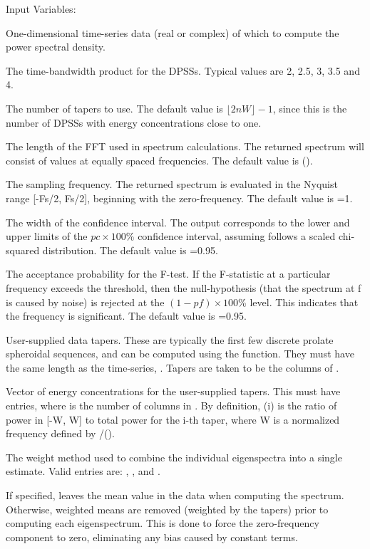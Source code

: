 \noindent Input Variables:
\begin{texitable}
\item[\var{x}] One-dimensional time-series data (real or complex) of which to compute the power spectral density.
\item[\var{nW}] The time-bandwidth product for the DPSSs.  Typical values are 2, 2.5, 3, 3.5 and 4.
\item[\var{nseq}] The number of tapers to use.  The default value is $\lfloor 2nW \rfloor - 1$, since this is the number of DPSSs with energy concentrations close to one.
\item[\var{NFFT}] The length of the FFT used in spectrum calculations.  The returned spectrum will consist of  values at equally spaced frequencies.  The default value is ().
\item[\var{Fs}] The sampling frequency.  The returned spectrum is evaluated in the Nyquist range [-Fs/2, Fs/2], beginning with the zero-frequency.  The default value is =1.
\item[\var{pc}] The width of the confidence interval.  The output  corresponds to the lower and upper limits of the $pc\times100$\% confidence interval, assuming  follows a scaled chi-squared distribution.  The default value is =0.95.
\item[\var{pf}] The acceptance probability for the F-test.  If the F-statistic at a particular frequency exceeds the threshold, then the null-hypothesis (that the spectrum at f is caused by noise) is rejected at the $(1-pf)\times100$\% level. This indicates that the frequency is significant.  The default value is =0.95.
\item [\var{h}] User-supplied data tapers.  These are typically the first few discrete prolate spheroidal sequences, and can be computed using the  function.  They must have the same length as the time-series, .  Tapers are taken to be the columns of .
\item [\var{l}] Vector of energy concentrations for the user-supplied tapers.  This must have  entries, where  is the number of columns in .  By definition, (i) is the ratio of power in [-W, W] to total power for the i-th taper, where W is a normalized frequency defined by /(). 
\item [\var{'method'}] The weight method used to combine the individual eigenspectra into a single estimate.  Valid entries are: , , and .
\item [\var{'mean'}]  If specified, leaves the mean value in the data when computing the spectrum.  Otherwise, weighted means are removed (weighted by the tapers) prior to computing each eigenspectrum.  This is done to force the zero-frequency component to zero, eliminating any bias caused by constant terms.
\end{texitable}

